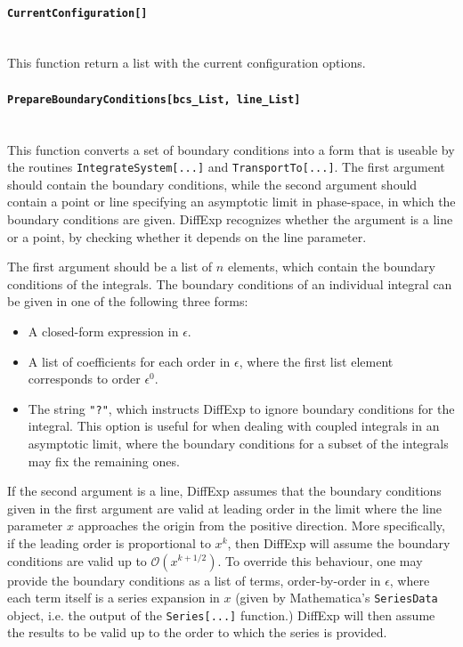 \documentclass{article}
\begin{document}
\paragraph{\texttt{CurrentConfiguration[]}}~\\
This function return a list with the current configuration options.
\paragraph{\texttt{PrepareBoundaryConditions[bcs_List, line_List]}}~\\
This function converts a set of boundary conditions into a form that is useable by the routines \texttt{IntegrateSystem[...]} and \texttt{TransportTo[...]}. The first argument should contain the boundary conditions, while the second argument should contain a point or line specifying an asymptotic limit in phase-space, in which the boundary conditions are given. DiffExp recognizes whether the argument is a line or a point, by checking whether it depends on the line parameter.
 
The first argument should be a list of $n$ elements, which contain the boundary conditions of the integrals. The boundary conditions of an individual integral can be given in one of the following three forms:
\begin{itemize}
  \item[1.] A closed-form expression in $\epsilon$.
  \item[2.] A list of coefficients for each order in $\epsilon$, where the first list element corresponds to order $\epsilon^0$.
  \item[3.] The string \texttt{"?"}, which instructs DiffExp to ignore boundary conditions for the integral. This option is useful for when dealing with coupled integrals in an asymptotic limit, where the boundary conditions for a subset of the integrals may fix the remaining ones.
\end{itemize}

If the second argument is a line, DiffExp assumes that the boundary conditions given in the first argument are valid at leading order in the limit where the line parameter $x$ approaches the origin from the positive direction. More specifically, if the leading order is proportional to $x^k$, then DiffExp will assume the boundary conditions are valid up to $\mathcal{O}(x^{k+1/2})$. To override this behaviour, one may provide the boundary conditions as a list of terms, order-by-order in $\epsilon$, where each term itself is a series expansion in $x$ (given by Mathematica's \texttt{SeriesData} object, i.e. the output of the \texttt{Series[...]} function.) DiffExp will then assume the results to be valid up to the order to which the series is provided.
\end{document}
